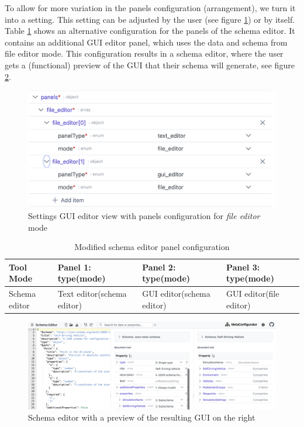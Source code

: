 To allow for more variation in the panels configuration (arrangement), we turn it into a setting.
This setting can be adjusted by the user (see figure \ref{fig:panels_definition_file_editor}) or by \toolname{} itself.
Table \ref{tab:panels_by_mode_schema_editor_with_preview} shows an alternative configuration for the panels of the schema editor.
It contains an additional GUI editor panel, which uses the data and schema from file editor mode. 
This configuration results in a schema editor, where the user gets a (functional) preview of the GUI that their schema will generate, see figure \ref{fig:panels_for_modified_schema_editor_config}.



\begin{figure}[!t]
    \centering
    \includegraphics[width=\columnwidth]{figures/panels_definition_file_editor}
    \caption{Settings GUI editor view with panels configuration for \textit{file editor} mode}
    \label{fig:panels_definition_file_editor}
\end{figure}


\begin{table}[!t]
\caption{Modified schema editor panel configuration}
\label{tab:panels_by_mode_schema_editor_with_preview}
\centering\tiny
\begin{tabular}{@{}llll@{}}
\toprule
\textbf{Tool Mode} & \textbf{Panel 1: type(mode)} & \textbf{Panel 2: type(mode)}& \textbf{Panel 3: type(mode)} \\ \midrule
Schema editor      & Text editor(schema editor)   & GUI editor(schema editor)   & GUI editor(file editor)    
  \\ \bottomrule
\end{tabular}
\end{table}


\begin{figure}
    \includegraphics[width=\textwidth]{figures/panels_for_modified_schema_editor_config}
    \caption{Schema editor with a preview of the resulting GUI on the right}
    \label{fig:panels_for_modified_schema_editor_config}
\end{figure}



